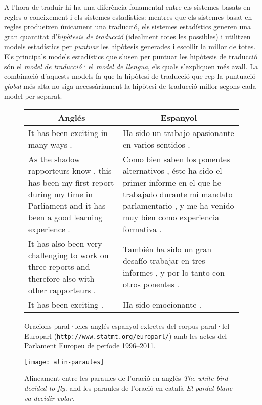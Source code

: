 A l'hora de traduir hi ha una diferència fonamental entre els sistemes
basats en regles o coneixement i els sistemes estadístics: mentres que
els sistemes basat en regles produeixen únicament una traducció, els
sistemes estadístics generen una gran quantitat d'\emph{hipòtesis de
  traducció} (idealment totes les possibles) i utilitzen models
estadístics per \emph{puntuar} les hipòtesis generades i escollir la
millor de totes. Els principals models estadístics que s'usen per
puntuar les hipòtesis de traducció són el \emph{model de traducció} i
el \emph{model de llengua}, els quals s'expliquen més avall. La
combinació d'aquests models fa que la hipòtesi de traducció que rep
la puntuació \emph{global} més alta no siga necessàriament la hipòtesi
de traducció millor segons cada model per separat.

\begin{figure}
\centering
\begin{tabular}{p{6cm}|p{6cm}}
  \multicolumn{1}{c|}{\textbf{Anglés}} & \multicolumn{1}{c}{\textbf{Espanyol}}\\
  \hline
  It has been exciting in many ways . &
  Ha sido un trabajo apasionante en varios sentidos . \\
  \hline
  As the shadow rapporteurs know , this has been my first report
  during my time in Parliament and it has been a good learning
  experience . &
  Como bien saben los ponentes alternativos , éste ha sido el primer
  informe en el que he trabajado durante mi mandato parlamentario , y
  me ha venido muy bien como experiencia formativa . \\
  \hline
  It has also been very challenging to work on three reports and
  therefore also with other rapporteurs . &
  También ha sido un gran desafío trabajar en tres informes , y por lo
  tanto con otros ponentes . \\
  \hline
  It has been exciting . &
  Ha sido emocionante . \\
  \hline
\end{tabular}
\caption{Oracions paral·leles anglés-espanyol extretes del corpus
  paral·lel Europarl (\texttt{http://www.statmt.org/europarl/}) amb
  les actes del Parlament Europeu de període 1996--2011.}
\label{fg:alinora}
\end{figure}


\begin{figure}
\centering
\texttt{[image: alin-paraules]}
\caption{Alineament entre les paraules de l'oració en anglés
  \emph{The white bird decided to fly.} and les paraules de l'oració en
català \emph{El pardal blanc va decidir volar.}}
\label{fg:alinpar}
\end{figure}


